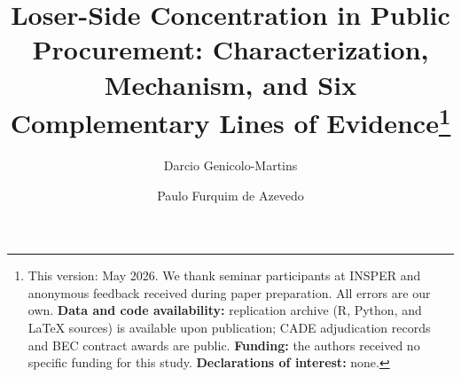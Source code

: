
\begin{frontmatter}

\title{Loser-Side Concentration in Public Procurement: Characterization, Mechanism, and Six Complementary Lines of Evidence\texorpdfstring{\footnote{This version: May 2026. We thank seminar participants at INSPER and anonymous feedback received during paper preparation. All errors are our own. \textbf{Data and code availability:} replication archive (R, Python, and \LaTeX{} sources) is available upon publication; CADE adjudication records and BEC contract awards are public. \textbf{Funding:} the authors received no specific funding for this study. \textbf{Declarations of interest:} none.}}{}}

\author[insper]{Darcio Genicolo-Martins}
\author[insper]{Paulo Furquim de Azevedo}


\end{frontmatter}
